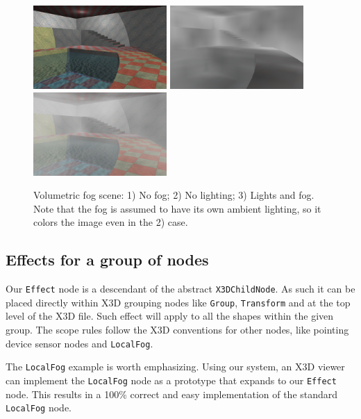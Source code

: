 \documentclass{egpubl}
\begin{document}
\begin{figure}[t]
  \centering
  \includegraphics[width=2.0in]{volumetric_animated_fog_no_fog}
  \includegraphics[width=2.0in]{volumetric_animated_fog_no_light}
  \includegraphics[width=2.0in]{volumetric_animated_fog_all}
  \caption{Volumetric fog scene: 1) No fog; 2) No lighting; 3) Lights and fog.
Note that the fog is assumed to have its own ambient lighting,
so it colors the image even in the 2) case.}
  \label{fig_fog}
\end{figure}

\subsection{Effects for a group of nodes}

Our \texttt{Effect} node is a descendant of the abstract \texttt{X3DChildNode}.
As such it can be placed directly within X3D grouping nodes like
\texttt{Group}, \texttt{Transform} and at the top level of the X3D file.
Such effect will apply to all the shapes within the given group.
The scope rules follow the X3D conventions for other nodes,
like pointing device sensor nodes and \texttt{LocalFog}.

The \texttt{LocalFog} example is worth emphasizing. Using our system,
an X3D viewer can implement the \texttt{LocalFog} node as a prototype
that expands to our \texttt{Effect} node. This results in a 100\% correct
and easy implementation of the standard \texttt{LocalFog} node.
\end{document}

